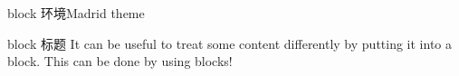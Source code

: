 \documentclass{ctexbeamer}
\begin{document}
\begin{frame}{block 环境}{Madrid theme}

\begin{block}{block 标题}
  It can be useful to treat some content differently by putting it into a block. This can be done by using blocks!
\end{block}

\end{frame}
\end{document}
